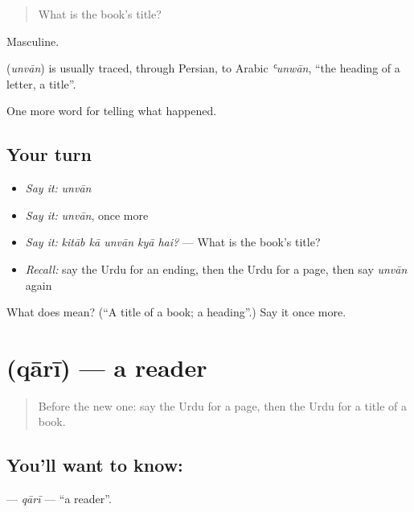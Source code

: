 \begin{quote}
What is the book's title?
\end{quote}

Masculine.

\begin{cousinweb}
\textbf{} (\emph{unvān}) is usually traced, through Persian, to Arabic \emph{ʿunwān}, \textquotedblleft{}the heading of a letter, a title\textquotedblright{}.
\end{cousinweb}

\begin{grammarlens}[title={What you've built}]
One more word for telling what happened.
\end{grammarlens}

\subsection*{Your turn}
\begin{itemize}
\raggedright
  \item \emph{Say it:} \emph{unvān}
  \item \emph{Say it:} \emph{unvān}, once more
  \item \emph{Say it:} \emph{kitāb kā unvān kyā hai?} — What is the book's title?
  \item \emph{Recall:} say the Urdu for an ending, then the Urdu for a page, then say \emph{unvān} again
\end{itemize}

\begin{tcolorbox}[breakable,colback=teal!4,colframe=teal!35!black,title={Before you move on}]
What does  mean? (\textquotedblleft{}A title of a book; a heading\textquotedblright{}.) Say it once more.
\end{tcolorbox}
\section[\texorpdfstring{\ur{قاری} (qārī)}{قاری (qārī)}]{ (qārī) — a reader}

\label{lesson:UR-C330-qari}



\begin{quote}
Before the new one: say the Urdu for a page, then the Urdu for a title of a book.
\end{quote}

\subsection*{You'll want to know: }
\textbf{} — \emph{qārī} — \textquotedblleft{}a reader\textquotedblright{}.

